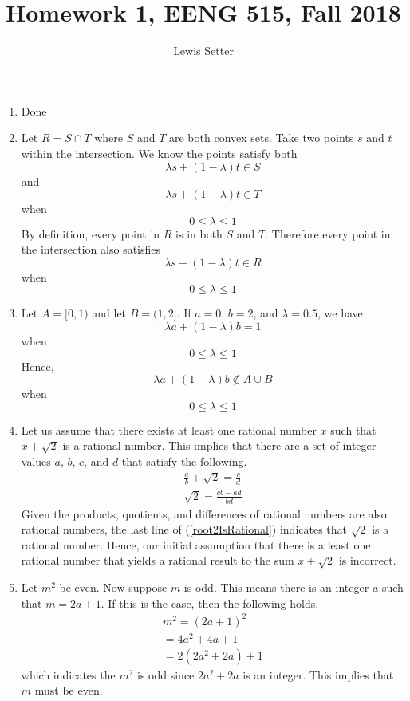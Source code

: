 \documentclass{article}
\title{Homework 1, EENG 515, Fall 2018}
\author{Lewis Setter}
\begin{document}
\maketitle

\begin{enumerate}
\item
Done

\item 
Let $R = S \cap T$ where $S$ and $T$ are both convex sets. Take two points $s$ and $t$
within the intersection. We know the points satisfy both
\[\lambda s + (1-\lambda)t \in S\]
and
\[\lambda s + (1-\lambda)t \in T\]
when
\[0 \leq \lambda \leq 1\]
By definition, every point in $R$ is in both $S$ and $T$. Therefore every point in
the intersection also satisfies
\[\lambda s + (1-\lambda)t \in R\]
when
\[0 \leq \lambda \leq 1\]

\item
Let $A = [0, 1)$ and let $B = (1, 2]$. If $a = 0$, $b = 2$, and $\lambda = 0.5$, we 
have
\[\lambda a + (1-\lambda)b = 1\]
when
\[0 \leq \lambda \leq 1\]
Hence, 
\[\lambda a + (1-\lambda) b \notin A \cup B\]
when
\[0 \leq \lambda \leq 1\]

\item
Let us assume that there exists at least one rational number $x$ such that $x + \sqrt{2}$ 
is a rational number. This implies that there are a set of integer values $a$, $b$, $c$, 
and $d$ that satisfy the following.
\begin{equation}\label{root2IsRational}
\begin{split}
\frac{a}{b} + \sqrt{2} = \frac{c}{d} \\
\sqrt{2} = \frac{cb-ad}{bd}
\end{split}
\end{equation}
Given the products, quotients, and differences of rational numbers are also rational
numbers, the last line of (\ref{root2IsRational}) indicates that $\sqrt{2}$ is a rational
number. Hence, our initial assumption that there is a least one rational number that
yields a rational result to the sum $x + \sqrt{2}$ is incorrect.

\item
Let $m^{2}$ be even. Now suppose $m$ is odd. This means there is an integer $a$ such 
that $m = 2a + 1$. If this is the case, then the following holds.
\begin{equation}
\begin{split}
m^{2} = (2a + 1)^{2} \\
= 4a^{2} + 4a + 1 \\
= 2(2a^{2} + 2a) + 1
\end{split}
\end{equation}
which indicates the $m^{2}$ is odd since $2a^{2} + 2a$ is an integer. This implies that 
$m$ must be even.
\end{enumerate}
\end{document}
